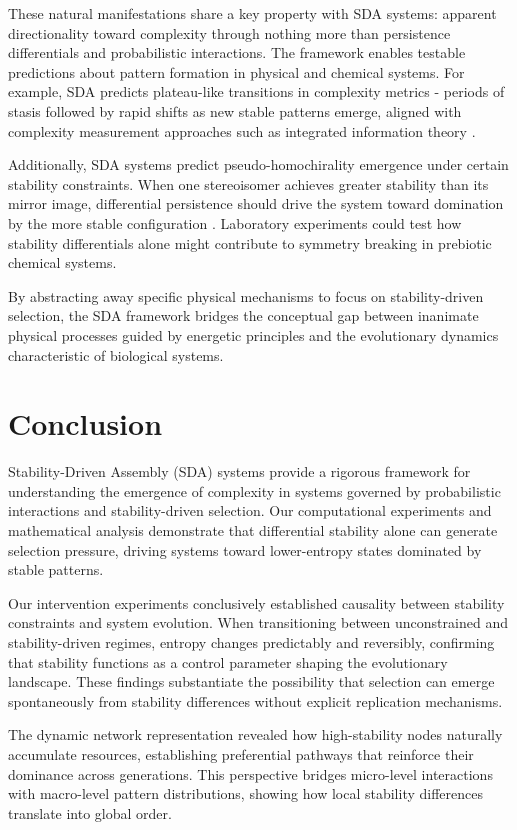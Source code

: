 \documentclass[preprint,12pt]{elsarticle}
\begin{document}
These natural manifestations share a key property with SDA systems: apparent directionality toward complexity through nothing more than persistence differentials and probabilistic interactions. The framework enables testable predictions about pattern formation in physical and chemical systems. For example, SDA predicts plateau-like transitions in complexity metrics - periods of stasis followed by rapid shifts as new stable patterns emerge, aligned with complexity measurement approaches such as integrated information theory \cite{tononi2008phi}.

Additionally, SDA systems predict pseudo-homochirality emergence under certain stability constraints. When one stereoisomer achieves greater stability than its mirror image, differential persistence should drive the system toward domination by the more stable configuration \cite{blackmond2010chiral}. Laboratory experiments could test how stability differentials alone might contribute to symmetry breaking in prebiotic chemical systems.

By abstracting away specific physical mechanisms to focus on stability-driven selection, the SDA framework bridges the conceptual gap between inanimate physical processes guided by energetic principles and the evolutionary dynamics characteristic of biological systems.

\section{Conclusion}

Stability-Driven Assembly (SDA) systems provide a rigorous framework for understanding the emergence of complexity in systems governed by probabilistic interactions and stability-driven selection. Our computational experiments and mathematical analysis demonstrate that differential stability alone can generate selection pressure, driving systems toward lower-entropy states dominated by stable patterns.

Our intervention experiments conclusively established causality between stability constraints and system evolution. When transitioning between unconstrained and stability-driven regimes, entropy changes predictably and reversibly, confirming that stability functions as a control parameter shaping the evolutionary landscape. These findings substantiate the possibility that selection can emerge spontaneously from stability differences without explicit replication mechanisms.

The dynamic network representation revealed how high-stability nodes naturally accumulate resources, establishing preferential pathways that reinforce their dominance across generations. This perspective bridges micro-level interactions with macro-level pattern distributions, showing how local stability differences translate into global order.
\end{document}
